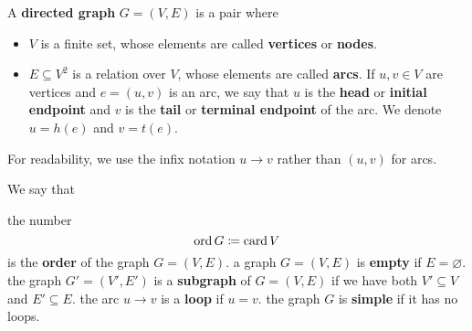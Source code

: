 \begin{definition}\label{def:directed_graph}\cite[1-graphs from chapter 1, section 1.1]{Gondran1984}
  A \textbf{directed graph} \( G = (V, E) \) is a pair where
  \begin{itemize}
    \item \( V \) is a finite set, whose elements are called \textbf{vertices} or \textbf{nodes}.
    \item \( E \subseteq V^2 \) is a relation over \( V \), whose elements are called \textbf{arcs}. If \( u, v \in V \) are vertices and \( e = (u, v) \) is an arc, we say that \( u \) is the \textbf{head} or \textbf{initial endpoint} and \( v \) is the \textbf{tail} or \textbf{terminal endpoint} of the arc. We denote $u = h(e)$ and $v = t(e)$.
  \end{itemize}

  For readability, we use the infix notation \( u \to v \) rather than \( (u, v) \) for arcs.

  We say that
  \begin{defenum}
     the number
    \begin{equation*}
      \operatorname{ord} G \coloneqq \operatorname{card} V
    \end{equation*}
    is the \textbf{order} of the graph \( G = (V, E) \).
     a graph \( G = (V, E) \) is \textbf{empty} if \( E = \varnothing \).
     the graph \( G' = (V', E') \) is a \textbf{subgraph} of \( G = (V, E) \) if we have both \( V' \subseteq V \) and \( E' \subseteq E \).
     the arc \( u \to v \) is a \textbf{loop} if \( u = v \).
    \cite[chapter 1, section 1.3]{Gondran1984} the graph \( G \) is \textbf{simple} if it has no loops.
  \end{defenum}
\end{definition}

